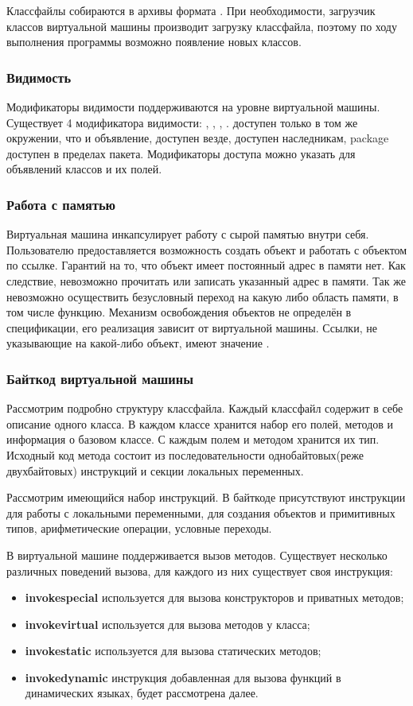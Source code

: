 Классфайлы собираются в архивы формата . При необходимости, загрузчик классов виртуальной машины производит загрузку классфайла, поэтому по ходу выполнения программы возможно появление новых классов.

\subsubsection{Видимость}
Модификаторы видимости поддерживаются на уровне виртуальной машины. Существует 4 модификатора видимости: , , , .  доступен только в том же окружении, что и объявление,  доступен везде,  доступен наследникам, package доступен в пределах пакета. Модификаторы доступа можно указать для объявлений классов и их полей.

\subsubsection{Работа с памятью}
Виртуальная машина инкапсулирует работу с сырой памятью внутри себя. Пользователю предоставляется возможность создать объект и работать с объектом по ссылке. Гарантий на то, что объект имеет постоянный адрес в памяти нет. Как следствие, невозможно прочитать или записать указанный адрес в памяти. Так же невозможно осуществить безусловный переход на какую либо область памяти, в том числе функцию. Механизм освобождения объектов не определён в спецификации, его реализация зависит от виртуальной машины. Ссылки, не указывающие на какой-либо объект, имеют значение .

\subsubsection{Байткод виртуальной машины}
Рассмотрим подробно структуру классфайла. Каждый классфайл содержит в себе описание одного класса. В каждом классе хранится набор его полей, методов и информация о базовом классе. С каждым полем и методом хранится их тип. Исходный код метода состоит из последовательности однобайтовых(реже двухбайтовых) инструкций и секции локальных переменных.

Рассмотрим имеющийся набор инструкций. В байткоде присутствуют инструкции для работы с локальными переменными, для создания объектов и примитивных типов, арифметические операции, условные переходы.

В виртуальной машине поддерживается вызов методов. Существует несколько различных поведений вызова, для каждого из них существует своя инструкция:
\begin{itemize}
    \item \textbf{invokespecial} используется для вызова конструкторов и приватных методов;
    \item \textbf{invokevirtual} используется для вызова методов у класса;
    \item \textbf{invokestatic} используется для вызова статических методов;
    \item \textbf{invokedynamic} инструкция добавленная для вызова функций в динамических языках, будет рассмотрена далее.
\end{itemize}


